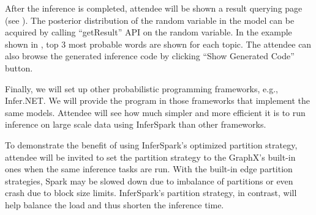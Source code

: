 After the inference is completed, attendee will be shown a result querying
page (see ). The posterior distribution of the
random variable in the model can be acquired by calling ``getResult'' API on
the random variable. In the example shown in , top
3 most probable words are shown for each topic.  The attendee can also browse
the generated inference code by clicking ``Show Generated Code'' button.


Finally, we will set up other probabilistic programming frameworks, e.g.,
Infer.NET. We will provide the program in those frameworks that
implement the same models. Attendee will see how much 
simpler and more efficient it is to
run inference on large scale data using InferSpark than other frameworks.

To demonstrate the benefit of using InferSpark's optimized partition strategy,
attendee will be invited to set the partition strategy to the GraphX's
built-in ones when the same inference tasks are run. With the built-in edge
partition strategies, Spark may be slowed down due to imbalance of partitions
or even crash due to block size limits. InferSpark's partition strategy,
in contrast, will help balance the load and thus shorten the inference time.

